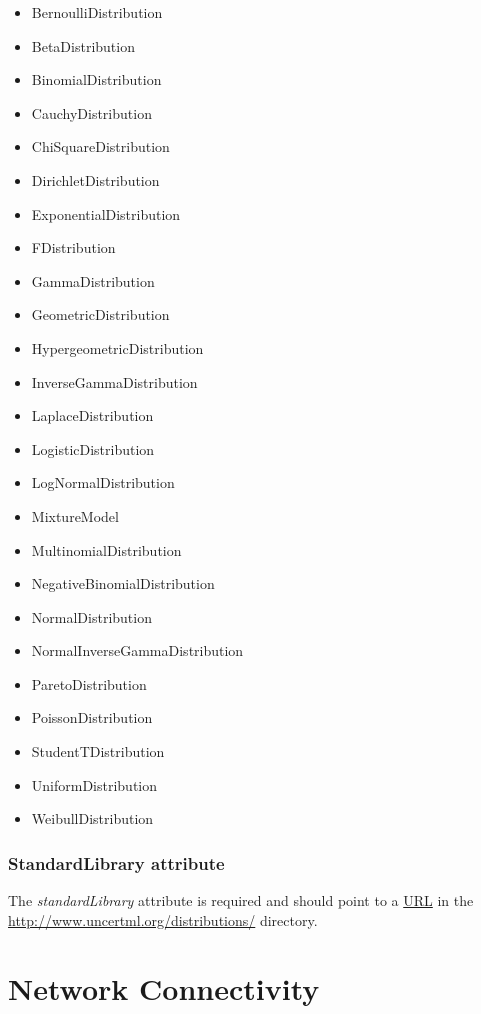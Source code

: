 \documentclass[draftspec]{ninemlspec}
\newcommand{\URL}{\href{http://en.wikipedia.org/wiki/Uniform_resource_locator}{URL}\xspace}
\begin{document}
\begin{multicols}{2}
\begin{itemize}
\item BernoulliDistribution
\item BetaDistribution
\item BinomialDistribution
\item CauchyDistribution
\item ChiSquareDistribution
\item DirichletDistribution
\item ExponentialDistribution
\item FDistribution
\item GammaDistribution
\item GeometricDistribution
\item HypergeometricDistribution
\item InverseGammaDistribution
\item LaplaceDistribution
\item LogisticDistribution
\item LogNormalDistribution
\item MixtureModel
\item MultinomialDistribution
\item NegativeBinomialDistribution
\item NormalDistribution
\item NormalInverseGammaDistribution
\item ParetoDistribution
\item PoissonDistribution
\item StudentTDistribution
\item UniformDistribution
\item WeibullDistribution
\end{itemize}
\end{multicols}


\subsubsection{StandardLibrary attribute}
The \textit{standardLibrary} attribute is required and should point to a \URL in the \href{http://www.uncertml.org/distributions/}{http://www.uncertml.org/distributions/} directory.


\section{Network Connectivity}
\end{document}
